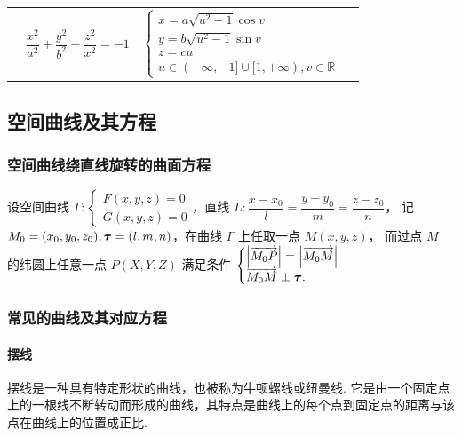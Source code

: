 \begin{table}[H]
{\begin{tabular}{l c | l l}
\begin{minipage}[b]{0.3\columnwidth}
        \end{minipage} & $\dfrac{x^2}{a^2}+\dfrac{y^2}{b^2}-\dfrac{z^2}{x^2}=-1$ & $\begin{cases}
            x=a\sqrt{u^2-1}\cos v\\y=b\sqrt{u^2-1}\sin v\\z=cu\\u\in(-\infty,-1]\cup[1,+\infty),v\in\mathbb{R}
        \end{cases}$
    \end{tabular}
    }
\end{table}

\subsection{空间曲线及其方程}

\subsubsection{空间曲线绕直线旋转的曲面方程}

\begin{theorem}[空间曲线绕直线旋转的曲面方程]
    设空间曲线 $\Gamma:\begin{cases}
        F(x,y,z)=0\\
        G(x,y,z)=0
    \end{cases}$，直线 $L:\dfrac{x-x_0}{l}=\dfrac{y-y_0}{m}=\dfrac{z-z_0}{n}$，
    记 $M_0=(x_0,y_0,z_0),\vb*{\tau}=(l,m,n)$，在曲线 $\Gamma$ 上任取一点 $M(x,y,z)$，
    而过点 $M$ 的纬圆上任意一点 $P(X,Y,Z)$ 满足条件 $\begin{cases}
        \qty|\overrightarrow{M_0P}|=\qty|\overrightarrow{M_0M}|\\
        \overrightarrow{M_0M}\perp \vb*{\tau}.
    \end{cases}$
\end{theorem}

\subsubsection{常见的曲线及其对应方程}

\paragraph{摆线}

摆线是一种具有特定形状的曲线，也被称为牛顿螺线或纽曼线. 
它是由一个固定点上的一根线不断转动而形成的曲线，其特点是曲线上的每个点到固定点的距离与该点在曲线上的位置成正比. 

